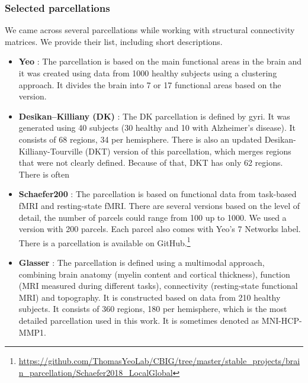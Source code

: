 \subsubsection{Selected parcellations}\label{sec:parcellations}

We came across several parcellations while working with structural connectivity matrices. We provide their list, including short descriptions. 

\begin{itemize}

    \item \textbf{Yeo}\label{parc:Yeo} \cite{thomas_yeo_organization_2011}: The parcellation is based on the main functional areas in the brain and it was created using data from 1000 healthy subjects using a clustering approach. It divides the brain into 7 or 17 functional areas based on the version.
    
    \item \textbf{Desikan–Killiany (DK)}\label{parc:DK}  \cite{desikan_automated_2006}: The DK parcellation is defined by gyri. It was generated using 40 subjects (30 healthy and 10 with Alzheimer’s disease). It consists of 68 regions, 34 per hemisphere. There is also an updated Desikan-Killiany-Tourville (DKT) \cite{klein_101_2012} version of this parcellation, which merges regions that were not clearly defined. Because of that, DKT has only 62 regions. There is often 
    
    \item \textbf{Schaefer200}\label{parc:Schaefer200}  \cite{schaefer_local-global_2018}: The parcellation is based on functional data from task-based fMRI and resting-state fMRI. There are several versions based on the level of detail, the number of parcels could range from 100 up to 1000. We used a version with 200 parcels. Each parcel also comes with Yeo's 7 Networks label.
    There is a parcellation is available on GitHub.\footnote{\url{https://github.com/ThomasYeoLab/CBIG/tree/master/stable_projects/brain_parcellation/Schaefer2018_LocalGlobal}}
    
    \item \textbf{Glasser}\label{parc:Glasser}  \cite{glasser_multi-modal_2016}: The parcellation is defined using a multimodal approach, combining brain anatomy (myelin content and cortical thickness), function (MRI measured during different tasks), connectivity (resting-state functional MRI) and topography. It is constructed based on data from 210 healthy subjects. It consists of 360 regions, 180 per hemisphere, which is the most detailed parcellation used in this work. It is sometimes denoted as MNI-HCP-MMP1.
    
\end{itemize}

